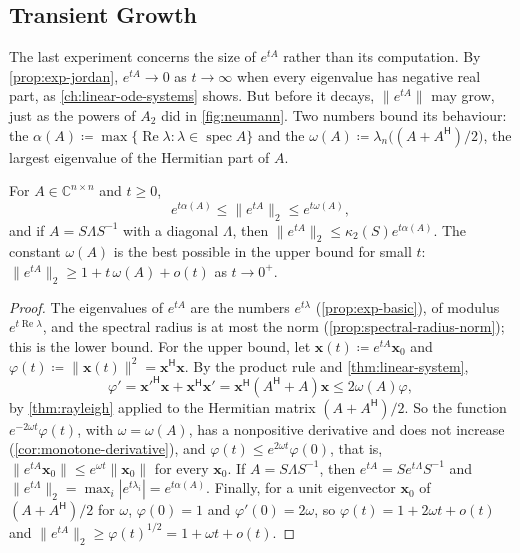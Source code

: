 \subsection{Transient Growth}

The last experiment concerns the size of $e^{tA}$ rather than its computation. By \cref{prop:exp-jordan}, $e^{tA}\to0$ as $t\to\infty$ when every eigenvalue has negative real part, as \cref{ch:linear-ode-systems} shows. But before it decays, $\|e^{tA}\|$ may grow, just as the powers of $A_2$ did in \cref{fig:neumann}. Two numbers bound its behaviour: the  $\alpha(A)\coloneqq\max\{\operatorname{Re}\lambda:\lambda\in\operatorname{spec}A\}$ and the  $\omega(A)\coloneqq\lambda_n\bigl((A+A^{\mathsf H})/2\bigr)$, the largest eigenvalue of the Hermitian part of $A$.

\begin{proposition}
\label{prop:exp-norm-bounds}
For $A\in\mathbb C^{n\times n}$ and $t\ge0$,
\[
e^{t\alpha(A)}\le\|e^{tA}\|_2\le e^{t\omega(A)} ,
\]
and if $A=S\Lambda S^{-1}$ with a diagonal $\Lambda$, then $\|e^{tA}\|_2\le\kappa_2(S)e^{t\alpha(A)}$. The constant $\omega(A)$ is the best possible in the upper bound for small $t$: $\|e^{tA}\|_2\ge1+t\,\omega(A)+o(t)$ as $t\to0^+$.
\end{proposition}

\begin{proof}
The eigenvalues of $e^{tA}$ are the numbers $e^{t\lambda}$ (\cref{prop:exp-basic}), of modulus $e^{t\operatorname{Re}\lambda}$, and the spectral radius is at most the norm (\cref{prop:spectral-radius-norm}); this is the lower bound. For the upper bound, let $\mathbf x(t)\coloneqq e^{tA}\mathbf x_0$ and $\varphi(t)\coloneqq\|\mathbf x(t)\|^2=\mathbf x^{\mathsf H}\mathbf x$. By the product rule and \cref{thm:linear-system},
\[
\varphi'=\mathbf x'^{\mathsf H}\mathbf x+\mathbf x^{\mathsf H}\mathbf x'=\mathbf x^{\mathsf H}(A^{\mathsf H}+A)\mathbf x\le2\omega(A)\varphi ,
\]
by \cref{thm:rayleigh} applied to the Hermitian matrix $(A+A^{\mathsf H})/2$. So the function $e^{-2\omega t}\varphi(t)$, with $\omega=\omega(A)$, has a nonpositive derivative and does not increase (\cref{cor:monotone-derivative}), and $\varphi(t)\le e^{2\omega t}\varphi(0)$, that is, $\|e^{tA}\mathbf x_0\|\le e^{\omega t}\|\mathbf x_0\|$ for every $\mathbf x_0$. If $A=S\Lambda S^{-1}$, then $e^{tA}=Se^{t\Lambda}S^{-1}$ and $\|e^{t\Lambda}\|_2=\max_i|e^{t\lambda_i}|=e^{t\alpha(A)}$. Finally, for a unit eigenvector $\mathbf x_0$ of $(A+A^{\mathsf H})/2$ for $\omega$, $\varphi(0)=1$ and $\varphi'(0)=2\omega$, so $\varphi(t)=1+2\omega t+o(t)$ and $\|e^{tA}\|_2\ge\varphi(t)^{1/2}=1+\omega t+o(t)$.
\end{proof}

